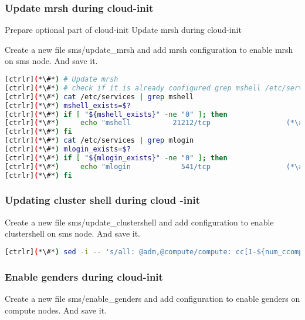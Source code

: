\subsubsection{Update mrsh during cloud-init}
Prepare optional part of cloud-init
Update mrsh during cloud-init 
 
Create a new file sms/update\_mrsh and add mrsh configuration to enable mrsh on sms node. And save it. 


\begin{lstlisting}[language=bash,keywords={}]
[ctrlr](*\#*) # Update mrsh
[ctrlr](*\#*) # check if it is already configured grep mshell /etc/services will return non-zero, else configure"
[ctrlr](*\#*) cat /etc/services | grep mshell
[ctrlr](*\#*) mshell_exists=$?
[ctrlr](*\#*) if [ "${mshell_exists}" -ne "0" ]; then
[ctrlr](*\#*)     echo "mshell          21212/tcp                  (*\#*) mrshd" >> /etc/services
[ctrlr](*\#*) fi
[ctrlr](*\#*) cat /etc/services | grep mlogin
[ctrlr](*\#*) mlogin_exists=$?
[ctrlr](*\#*) if [ "${mlogin_exists}" -ne "0" ]; then
[ctrlr](*\#*)     echo "mlogin            541/tcp                  (*\#*) mrlogind" >> /etc/services
[ctrlr](*\#*) fi
\end{lstlisting} 


\subsubsection{Updating cluster shell during cloud -init}
Create a new file sms/update\_clustershell and add configuration to enable clustershell on sms node. And save it. 


\begin{lstlisting}[language=bash,keywords={}]
[ctrlr](*\#*) sed -i -- 's/all: @adm,@compute/compute: cc[1-${num_ccomputes}]\n&/' /etc/clustershell/groups.d/local.cfg
\end{lstlisting} 
 
 \subsubsection{Enable genders during cloud-init}
 Create a new file sms/enable\_genders and add configuration to enable genders on compute nodes. And save it. 

